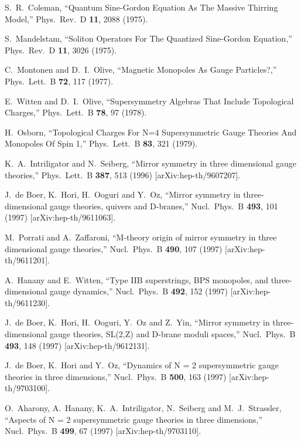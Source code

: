 \documentclass[a4paper,12pt, amsfonts, amssymb]{article}
\begin{document}
\begin{thebibliography}{99}


S.~R.~Coleman, ``Quantum Sine-Gordon Equation As The Massive Thirring Model,''
Phys.\ Rev.\ D {\bf 11}, 2088 (1975).

S.~Mandelstam, ``Soliton Operators For The Quantized Sine-Gordon Equation,''
Phys.\ Rev.\ D {\bf 11}, 3026 (1975).

C.~Montonen and D.~I.~Olive,
``Magnetic Monopoles As Gauge Particles?,''
Phys.\ Lett.\ B {\bf 72}, 117 (1977).

E.~Witten and D.~I.~Olive,
``Supersymmetry Algebras That Include Topological Charges,''
Phys.\ Lett.\ B {\bf 78}, 97 (1978).

H.~Osborn,
``Topological Charges For N=4 Supersymmetric Gauge Theories And Monopoles Of Spin 1,'' Phys.\ Lett.\ B {\bf 83}, 321 (1979).

K.~A.~Intriligator and N.~Seiberg,
``Mirror symmetry in three dimensional gauge theories,''
Phys.\ Lett.\ B {\bf 387}, 513 (1996) [arXiv:hep-th/9607207].

J.~de Boer, K.~Hori, H.~Ooguri and Y.~Oz,
``Mirror symmetry in three-dimensional gauge theories, quivers and  D-branes,''
Nucl.\ Phys.\ B {\bf 493}, 101 (1997)
[arXiv:hep-th/9611063].

M.~Porrati and A.~Zaffaroni,
``M-theory origin of mirror symmetry in three dimensional gauge theories,''
Nucl.\ Phys.\ B {\bf 490}, 107 (1997)
[arXiv:hep-th/9611201].

A.~Hanany and E.~Witten, ``Type IIB superstrings, BPS monopoles, and
three-dimensional gauge  dynamics,'' Nucl.\ Phys.\ B {\bf 492}, 152 (1997)
[arXiv:hep-th/9611230].

J.~de Boer, K.~Hori, H.~Ooguri, Y.~Oz and Z.~Yin,
``Mirror symmetry in three-dimensional gauge theories, SL(2,Z) and  D-brane moduli spaces,'' Nucl.\ Phys.\ B {\bf 493}, 148 (1997)
[arXiv:hep-th/9612131].

J.~de Boer, K.~Hori and Y.~Oz,
``Dynamics of N = 2 supersymmetric gauge theories in three dimensions,''
Nucl.\ Phys.\ B {\bf 500}, 163 (1997)
[arXiv:hep-th/9703100].

O.~Aharony, A.~Hanany, K.~A.~Intriligator, N.~Seiberg and M.~J.~Strassler,
``Aspects of N = 2 supersymmetric gauge theories in three dimensions,''
Nucl.\ Phys.\ B {\bf 499}, 67 (1997) [arXiv:hep-th/9703110].


\end{thebibliography}
\end{document}
